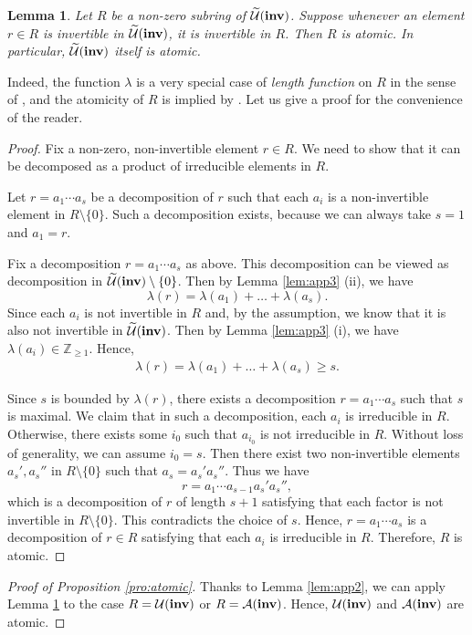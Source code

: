\documentclass{amsart}
\newtheorem{lemma}[theorem]{Lemma}
\theoremstyle{definition}
\theoremstyle{remark}
\numberwithin{equation}{section}
\begin{document}
\begin{lemma}\label{lem:app4}
    Let $R$ be a non-zero subring of $\widetilde {\mathcal U}({\bf inv})$. Suppose whenever an element $r\in R$ is invertible in $\widetilde {\mathcal U}({\bf inv})$, it is invertible in $R$. Then $R$ is atomic. In particular, $\widetilde {\mathcal U}({\bf inv})$ itself is atomic.
\end{lemma}

Indeed, the function $\lambda$ is a very special case of \emph{length function} on $R$ in the sense of \cite[Definition 1.1.3]{geroldinger2006non}, and the atomicity of $R$ is implied by \cite[Proposition 1.1.4]{geroldinger2006non}. Let us give a proof for the convenience of the reader.


\begin{proof}

Fix a non-zero, non-invertible element $r\in R$. We need to show that it can be decomposed as a product of irreducible elements in $R$. 



Let $r=a_1\cdots a_s$ be a decomposition of $r$ such that each $a_i$ is a non-invertible element in $R\setminus\{0\}$. Such a decomposition exists, because we can always take $s=1$ and $a_1=r$.

Fix a decomposition $r=a_1\cdots a_s$ as above. This decomposition can be viewed as decomposition in $\widetilde {\mathcal U}({\bf inv})\setminus\{0\}$. Then by Lemma \ref{lem:app3} (ii), we have $$\lambda(r)=\lambda(a_1)+\ldots +\lambda(a_s).$$
Since each $a_i$ is not invertible in $R$ and, by the assumption, we know that it is also not invertible in $\widetilde {\mathcal U}({\bf inv})$. Then by Lemma \ref{lem:app3} (i), we have $\lambda(a_i)\in\mathbb Z_{\geq 1}$.
Hence, 
\begin{eqnarray}\label{eqn:r>s}
    \lambda(r)=\lambda(a_1)+\ldots +\lambda(a_s)\geq s.\nonumber
\end{eqnarray}

Since $s$ is bounded by $\lambda(r)$, there exists a decomposition $r=a_1\cdots a_s$ such that $s$ is maximal. We claim that in such a decomposition, each $a_i$ is irreducible in $R$. Otherwise, 
there exists some $i_0$ such that $a_{i_0}$ is not irreducible in $R$. Without loss of generality, we can assume $i_0=s$.
Then there exist two non-invertible elements $a_s',a_s''$ in $R\setminus\{0\}$ such that $a_s=a_s'a_s''$. Thus we have $$r=a_1\cdots a_{s-1}a_s'a_s'',$$ which is a decomposition of $r$ of length $s+1$ satisfying that each factor is not invertible in $R\setminus\{0\}$. This contradicts the choice of $s$. Hence,  $r=a_1\cdots a_s$ is a decomposition of $r\in R$ satisfying that each $a_i$ is irreducible in $R$. Therefore, $R$ is atomic.
\end{proof}


\begin{proof}[Proof of Proposition \ref{pro:atomic}] Thanks to Lemma \ref{lem:app2}, we can apply  Lemma \ref{lem:app4} to the case $R=\mathcal U({\bf inv})$ or $R=\mathcal A({\bf inv})$. Hence, $\mathcal U({\bf inv})$ and $\mathcal A({\bf inv})$ are atomic.
\end{proof}






\end{document}
